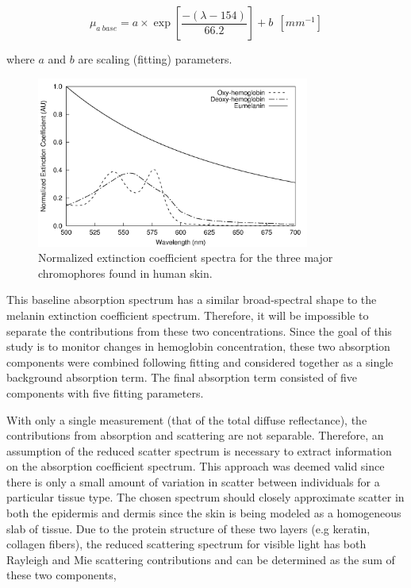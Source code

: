 \begin{equation}
	\mu_{a~base} = a \times \exp \left[\frac{-(\lambda - 154)}{66.2}\right] + b~~\left[mm^{-1}\right]
\end{equation}

where $a$ and $b$ are scaling (fitting) parameters.

\begin{figure}
	\centering \includegraphics[width=0.8\textwidth]{figures/p3-chromophores.png}
	\caption[Major chromophore extinction coefficient spectra]{\label{fig:p3-chromophores}Normalized extinction coefficient spectra for the three major chromophores found in human skin.}
\end{figure}

This baseline absorption spectrum has a similar broad-spectral shape to the melanin extinction coefficient spectrum. Therefore, it will be impossible to separate the contributions from these two concentrations. Since the goal of this study is to monitor changes in hemoglobin concentration, these two absorption components were combined following fitting and considered together as a single background absorption term. The final absorption term consisted of five components with five fitting parameters.

With only a single measurement (that of the total diffuse reflectance), the contributions from absorption and scattering are not separable. Therefore, an assumption of the reduced scatter spectrum is necessary to extract information on the absorption coefficient spectrum. This approach was deemed valid since there is only a small amount of variation in scatter between individuals for a particular tissue type.\cite{Kim2011} The chosen spectrum should closely approximate scatter in both the epidermis and dermis since the skin is being modeled as a homogeneous slab of tissue. Due to the protein structure of these two layers (e.g keratin, collagen fibers), the reduced scattering spectrum for visible light has both Rayleigh and Mie scattering contributions and can be determined as the sum of these two components,\cite{Jacques1998}

